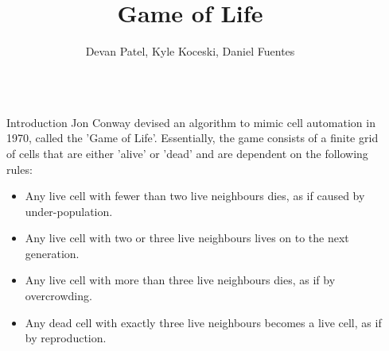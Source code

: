 \documentclass[final]{beamer}
\title{Game of Life} %
\author{Devan Patel, Kyle Koceski, Daniel Fuentes} %
\institute{CIS 4930: Concurrent Programming} %
\newlength{\sepwid}
\newlength{\onecolwid}
\begin{document}

\setlength{\belowcaptionskip}{2ex} %
\setlength\belowdisplayshortskip{2ex} %

\begin{frame}[t] %

\begin{columns}[t] %

\begin{column}{\sepwid}\end{column} %

\begin{column}{\onecolwid} %



\begin{block}{Introduction}
Jon Conway devised an algorithm to mimic cell automation in 1970, called the 'Game of Life'. Essentially, the game consists of a finite grid of cells that are either 'alive' or 'dead' and are dependent on the following rules:
\begin{itemize}
\item Any live cell with fewer than two live neighbours dies, as if caused by under-population.
\item Any live cell with two or three live neighbours lives on to the next generation.
\item Any live cell with more than three live neighbours dies, as if by overcrowding.
\item Any dead cell with exactly three live neighbours becomes a live cell, as if by reproduction.
\end{itemize}

\end{block}




\end{column}
\end{columns}
\end{frame}
\end{document}
